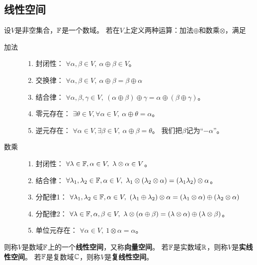\subsection{线性空间}
\begin{definition}[线性空间] \label{def-linear-space}
  设$V$是非空集合，$\mathbb{F}$是一个数域。
  若在$V$上定义两种运算：加法$\oplus$和数乘$\otimes$，满足
  \begin{description}
    \item[加法]
    \begin{enumerate}
      \item 封闭性：
      $\forall\alpha,\beta\in V,\ \alpha\oplus\beta\in V$。
      \item 交换律：
      $\forall\alpha,\beta\in V,\ \alpha\oplus\beta = \beta\oplus\alpha$
      \item 结合律：
      $\forall\alpha,\beta,\gamma\in V,\ 
        (\alpha\oplus\beta)\oplus\gamma = \alpha\oplus(\beta\oplus\gamma)$。
      \item 零元存在：
      $\exists\theta\in V,\forall\alpha\in V,\ \alpha\oplus\theta=\alpha$。
      \item 逆元存在：
      $\forall\alpha\in V,\exists\beta\in V,\ \alpha\oplus\beta=\theta$。
      我们把$\beta$记为``$-\alpha$''。
    \end{enumerate}  
    \item[数乘]
    \begin{enumerate}
      \item 封闭性：
      $\forall\lambda\in\mfF,\alpha\in V,\ \lambda\otimes\alpha\in V$。
      \item 结合律：
      $\forall\lambda_1,\lambda_2\in\mfF,\alpha\in V,\ 
        \lambda_1\otimes(\lambda_2\otimes\alpha) =
        (\lambda_1\lambda_2)\otimes\alpha$。
      \item 分配律1：
      $\forall\lambda_1,\lambda_2\in\mfF,\alpha\in V,\ 
        (\lambda_1\oplus\lambda_2)\otimes\alpha =
        (\lambda_1\otimes\alpha)\oplus(\lambda_2\otimes\alpha)$
      \item 分配律2：
      $\forall\lambda\in\mfF,\alpha,\beta\in V,\ 
        \lambda\otimes(\alpha\oplus\beta) =
        (\lambda\otimes\alpha)\oplus(\lambda\otimes\beta)$。
      \item 单位元存在：
      $\forall\alpha\in V,\ 
        1\otimes\alpha = \alpha$。
    \end{enumerate}
  \end{description}
  则称$V$是数域$\mathbb{F}$上的一个\textbf{线性空间}，又称\textbf{向量空间}。
  若$\mathbb{F}$是实数域$\mathbb{R}$，则称$V$是\textbf{实线性空间}。
  若$\mathbb{F}$是复数域$\mathbb{C}$，则称$V$是\textbf{复线性空间}。
\end{definition}

